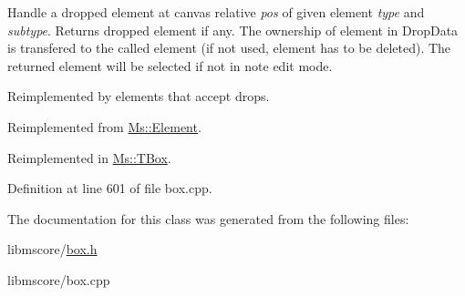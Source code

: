 Handle a dropped element at canvas relative {\itshape pos} of given element {\itshape type} and {\itshape subtype}. Returns dropped element if any. The ownership of element in Drop\+Data is transfered to the called element (if not used, element has to be deleted). The returned element will be selected if not in note edit mode.

Reimplemented by elements that accept drops. 

Reimplemented from \hyperlink{class_ms_1_1_element_a0ca69a9fb48e7b9fb481aacaf3860032}{Ms\+::\+Element}.



Reimplemented in \hyperlink{class_ms_1_1_t_box_a3be73eda7f604bdaa08d124d68a84bca}{Ms\+::\+T\+Box}.



Definition at line 601 of file box.\+cpp.



The documentation for this class was generated from the following files\+:\begin{DoxyCompactItemize}
\item 
libmscore/\hyperlink{box_8h}{box.\+h}\item 
libmscore/box.\+cpp\end{DoxyCompactItemize}
